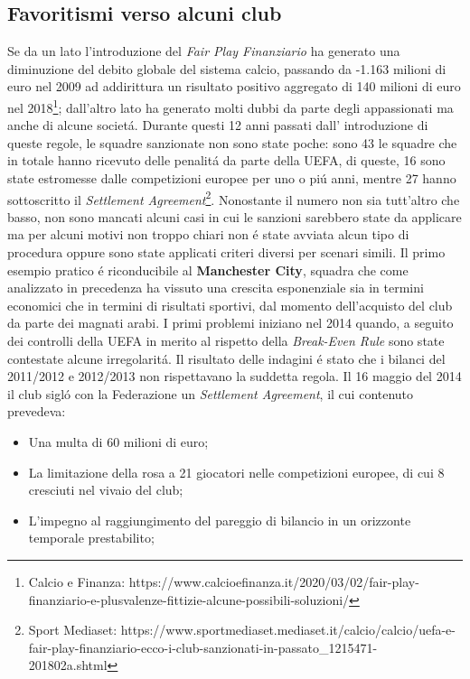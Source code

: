 \documentclass[
    corpo=12pt,
    oneside,
    evenboxes,
    tipotesi=triennale,
    stile=classica,
    oldstyle,
    autoretitolo,
    greek,
]{toptesi}
\begin{document}
\begin{interlinea}{1.5}
\section{Favoritismi verso alcuni club}
Se da un lato l'introduzione del \emph{Fair Play Finanziario} ha generato una diminuzione del debito globale del sistema calcio,
passando da -1.163 milioni di euro nel 2009 ad addirittura un risultato positivo aggregato di 140 milioni di euro nel 2018\footnote{Calcio e Finanza: https://www.calcioefinanza.it/2020/03/02/fair-play-finanziario-e-plusvalenze-fittizie-alcune-possibili-soluzioni/};
dall'altro lato ha generato molti dubbi da parte degli appassionati ma anche di alcune societ\'a. Durante questi 12 anni passati dall'
introduzione di queste regole, le squadre sanzionate non sono state poche: sono 43 le squadre che in totale hanno ricevuto delle penalit\'a
da parte della UEFA, di queste, 16 sono state estromesse dalle competizioni europee per uno o pi\'u anni, mentre 27 hanno sottoscritto il 
\emph{Settlement Agreement}\footnote{Sport Mediaset: https://www.sportmediaset.mediaset.it/calcio/calcio/uefa-e-fair-play-finanziario-ecco-i-club-sanzionati-in-passato\_1215471-201802a.shtml}. 
Nonostante il numero non sia tutt'altro che basso, non sono mancati alcuni casi in cui le sanzioni sarebbero state da
applicare ma per alcuni motivi non troppo chiari non \'e state avviata alcun tipo di procedura oppure sono state applicati criteri diversi per
scenari simili.\newline
Il primo esempio pratico \'e riconducibile al \textbf{Manchester City}, squadra che come analizzato in precedenza ha vissuto una crescita esponenziale
sia in termini \linebreak economici che in termini di risultati sportivi, dal momento dell'acquisto del club da parte dei magnati arabi. I primi problemi
iniziano nel 2014 quando, a seguito dei controlli della UEFA in merito al rispetto della \emph{Break-Even Rule} sono state contestate alcune irregolarit\'a.
Il risultato delle indagini \'e stato che i bilanci del 2011/2012 e 2012/2013 non rispettavano la suddetta regola. Il 16 maggio del 2014 il club sigl\'o con la Federazione
un \emph{Settlement Agreement}, il cui contenuto prevedeva:
\begin{itemize}
    \item Una multa di 60 milioni di euro;
    \item La limitazione della rosa a 21 giocatori nelle competizioni europee, di cui 8 cresciuti nel vivaio del club;
    \item L’impegno al raggiungimento del pareggio di bilancio in un orizzonte temporale prestabilito;

\end{itemize}
\end{interlinea}
\end{document}
